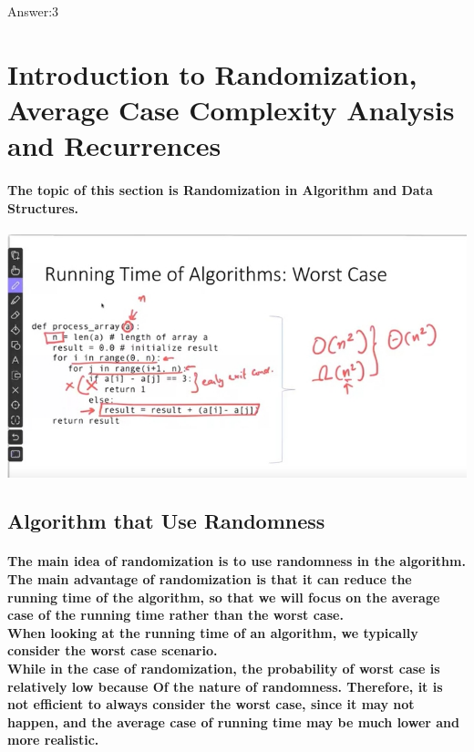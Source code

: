 \documentclass{article}
\begin{document}
Answer:3\\


\section{Introduction to Randomization, Average Case Complexity Analysis and Recurrences}

\paragraph{The topic of this section is Randomization in Algorithm and Data Structures.\\}

\includegraphics[width=\textwidth]{randomizationrunningtime.png}

\subsection{Algorithm that Use Randomness}

\paragraph{The main idea of randomization is to use randomness in the algorithm.\\
The main advantage of randomization is that it can reduce the running time of the algorithm, so
that we will focus on the average case of the running time rather than the worst case.\\
When looking at the running time of an algorithm, we typically consider the worst case scenario.\\
While in the case of randomization, the probability of worst case is relatively low because Of
the nature of randomness. Therefore, it is not efficient to always consider the worst case, since
it may not happen, and the average case of running time may be much lower and more realistic.\\}
\end{document}
